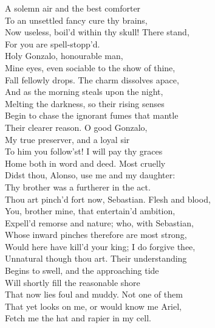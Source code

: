 

\begin{verse_speech}[Prospero] 
A solemn air and the best comforter\\
To an unsettled fancy cure thy brains,\\
Now useless, boil'd within thy skull! There stand,\\
For you are spell-stopp'd.\\
Holy Gonzalo, honourable man,\\
Mine eyes, even sociable to the show of thine,\\
Fall fellowly drops. The charm dissolves apace,\\
And as the morning steals upon the night,\\
Melting the darkness, so their rising senses\\
Begin to chase the ignorant fumes that mantle\\
Their clearer reason. O good Gonzalo,\\
My true preserver, and a loyal sir\\
To him you follow'st! I will pay thy graces\\
Home both in word and deed. Most cruelly\\
Didst thou, Alonso, use me and my daughter:\\
Thy brother was a furtherer in the act.\\
Thou art pinch'd fort now, Sebastian. Flesh and blood,\\
You, brother mine, that entertain'd ambition,\\
Expell'd remorse and nature; who, with Sebastian,\\
Whose inward pinches therefore are most strong,\\
Would here have kill'd your king; I do forgive thee,\\
Unnatural though thou art. Their understanding\\
Begins to swell, and the approaching tide\\
Will shortly fill the reasonable shore\\
That now lies foul and muddy. Not one of them\\
That yet looks on me, or would know me Ariel,\\
Fetch me the hat and rapier in my cell.\\


\end{verse_speech}
